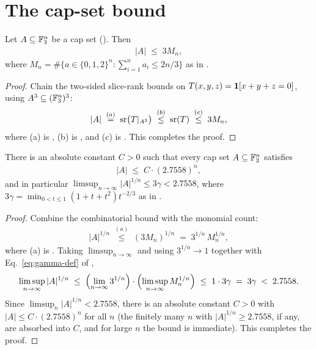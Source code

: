 \section{The cap-set bound}\label{sec:main}

\begin{theorem}\label{thm:cap-set}
Let $A\subseteq\mathbb{F}_3^n$ be a cap set (). Then
\begin{align*}
|A|\;\le\;3M_n,
\end{align*}
where $M_n=\#\{a\in\{0,1,2\}^n:\sum_{i=1}^n a_i\le 2n/3\}$ as in
.
\end{theorem}

\begin{proof}
Chain the two-sided slice-rank bounds on $T(x,y,z)=\mathbf{1}[x+y+z=0]$, using $A^3\subseteq(\mathbb{F}_3^n)^3$:
\begin{align*}
|A|
\;\overset{(a)}{=}\;\operatorname{sr}\!\big(T|_{A^3}\big)
\;\overset{(b)}{\le}\;\operatorname{sr}(T)
\;\overset{(c)}{\le}\;3M_n,
\end{align*}
where (a) is , (b) is , and (c) is
. This completes the proof.
\end{proof}

\begin{corollary}\label{cor:numerical}
There is an absolute constant $C>0$ such that every cap set $A\subseteq\mathbb{F}_3^n$
satisfies
\begin{align*}
|A|\;\le\;C\cdot(2.7558)^n,
\end{align*}
and in particular $\limsup_{n\to\infty}|A|^{1/n}\le 3\gamma<2.7558$, where
$3\gamma=\min_{0<t\le1}(1+t+t^2)t^{-2/3}$ as in .
\end{corollary}

\begin{proof}
Combine the combinatorial bound with the monomial count:
\begin{align*}
|A|^{1/n}
\;\overset{(a)}{\le}\;(3M_n)^{1/n}
\;=\;3^{1/n}\,M_n^{1/n},
\end{align*}
where (a) is . Taking $\limsup_{n\to\infty}$ and using
$3^{1/n}\to 1$ together with Eq.~\eqref{eq:gamma-def} of ,
\begin{align*}
\limsup_{n\to\infty}|A|^{1/n}
\;\le\;\Bigl(\lim_{n\to\infty}3^{1/n}\Bigr)\cdot\Bigl(\limsup_{n\to\infty}M_n^{1/n}\Bigr)
\;\le\;1\cdot 3\gamma\;=\;3\gamma\;<\;2.7558.
\end{align*}
Since $\limsup_n|A|^{1/n}<2.7558$, there is an absolute constant $C>0$ with
$|A|\le C\cdot(2.7558)^n$ for all $n$ (the finitely many $n$ with
$|A|^{1/n}\ge 2.7558$, if any, are absorbed into $C$, and for large $n$ the bound is
immediate). This completes the proof.
\end{proof}

